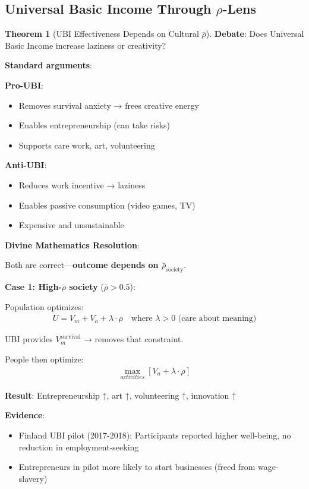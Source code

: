 \documentclass[11pt,a4paper]{article}
\theoremstyle{definition}
\newtheorem{theorem}{Theorem}[section]
\theoremstyle{remark}
\begin{document}
\begin{small}
\begin{enumerate}
\subsection{Universal Basic Income Through \(\rho\)-Lens}

\begin{theorem}[UBI Effectiveness Depends on Cultural \(\bar{\rho}\)]
\textbf{Debate}: Does Universal Basic Income increase laziness or creativity?

\textbf{Standard arguments}:

\textbf{Pro-UBI}:
\begin{itemize}
    \item Removes survival anxiety → frees creative energy
    \item Enables entrepreneurship (can take risks)
    \item Supports care work, art, volunteering
\end{itemize}

\textbf{Anti-UBI}:
\begin{itemize}
    \item Reduces work incentive → laziness
    \item Enables passive consumption (video games, TV)
    \item Expensive and unsustainable
\end{itemize}

\textbf{Divine Mathematics Resolution}:

Both are correct—\textbf{outcome depends on \(\bar{\rho}_{\text{society}}\)}.

\textbf{Case 1: High-\(\bar{\rho}\) society} (\(\bar{\rho} > 0.5\)):

Population optimizes:
\begin{align}
U = V_m + V_a + \lambda \cdot \rho \quad \text{where } \lambda > 0 \text{ (care about meaning)}
\end{align}

UBI provides \(V_m^{\text{survival}}\) → removes that constraint.

People then optimize:
\begin{align}
\max_{activities} \left[ V_a + \lambda \cdot \rho \right]
\end{align}

\textbf{Result}: Entrepreneurship ↑, art ↑, volunteering ↑, innovation ↑

\textbf{Evidence}:
\begin{itemize}
    \item Finland UBI pilot (2017-2018): Participants reported higher well-being, no reduction in employment-seeking
    \item Entrepreneurs in pilot more likely to start businesses (freed from wage-slavery)
\end{itemize}


\end{theorem}
\end{enumerate}
\end{small}
\end{document}
